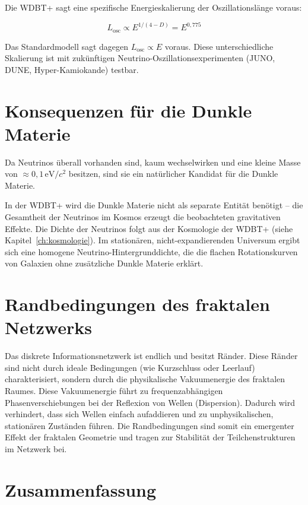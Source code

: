 Die WDBT+ sagt eine spezifische Energieskalierung der Oszillationslänge voraus:

\[
\boxed{L_{\text{osc}} \propto E^{1/(4-D)} = E^{0,775}}
\]

Das Standardmodell sagt dagegen \( L_{\text{osc}} \propto E \) voraus. Diese unterschiedliche Skalierung ist mit zukünftigen Neutrino-Oszillationsexperimenten (JUNO, DUNE, Hyper-Kamiokande) testbar.

\section{Konsequenzen für die Dunkle Materie}
\label{sec:nu_dunkle_materie}

Da Neutrinos überall vorhanden sind, kaum wechselwirken und eine kleine Masse von \( \approx 0{,}1 \, \text{eV}/c^2 \) besitzen, sind sie ein natürlicher Kandidat für die Dunkle Materie.

In der WDBT+ wird die Dunkle Materie nicht als separate Entität benötigt – die Gesamtheit der Neutrinos im Kosmos erzeugt die beobachteten gravitativen Effekte. Die Dichte der Neutrinos folgt aus der Kosmologie der WDBT+ (siehe Kapitel~\ref{ch:kosmologie}). Im stationären, nicht-expandierenden Universum ergibt sich eine homogene Neutrino-Hintergrunddichte, die die flachen Rotationskurven von Galaxien ohne zusätzliche Dunkle Materie erklärt.

\section{Randbedingungen des fraktalen Netzwerks}
\label{sec:nu_randbedingungen}

Das diskrete Informationsnetzwerk ist endlich und besitzt Ränder. Diese Ränder sind nicht durch ideale Bedingungen (wie Kurzschluss oder Leerlauf) charakterisiert, sondern durch die physikalische Vakuumenergie des fraktalen Raumes. Diese Vakuumenergie führt zu frequenzabhängigen Phasenverschiebungen bei der Reflexion von Wellen (Dispersion). Dadurch wird verhindert, dass sich Wellen einfach aufaddieren und zu unphysikalischen, stationären Zuständen führen. Die Randbedingungen sind somit ein emergenter Effekt der fraktalen Geometrie und tragen zur Stabilität der Teilchenstrukturen im Netzwerk bei.

\section{Zusammenfassung}
\label{sec:nu_zusammenfassung}

